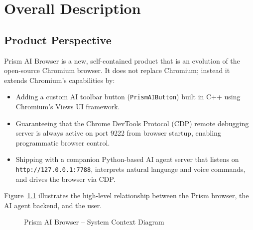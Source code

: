 \chapter{Overall Description}

\section{Product Perspective}
Prism AI Browser is a new, self-contained product that is an evolution of the open-source Chromium browser. It does not replace Chromium; instead it extends Chromium's capabilities by:
\begin{itemize}[leftmargin=*]
    \item Adding a custom AI toolbar button (\texttt{PrismAIButton}) built in C++ using Chromium's Views UI framework.
    \item Guaranteeing that the Chrome DevTools Protocol (CDP) remote debugging server is always active on port 9222 from browser startup, enabling programmatic browser control.
    \item Shipping with a companion Python-based AI agent server that listens on \texttt{http://127.0.0.1:7788}, interprets natural language and voice commands, and drives the browser via CDP.
\end{itemize}

Figure~\ref{fig:system-context} illustrates the high-level relationship between the Prism browser, the AI agent backend, and the user.

\begin{figure}[H]
\centering
{}
\caption{Prism AI Browser -- System Context Diagram}
\label{fig:system-context}
\end{figure}


